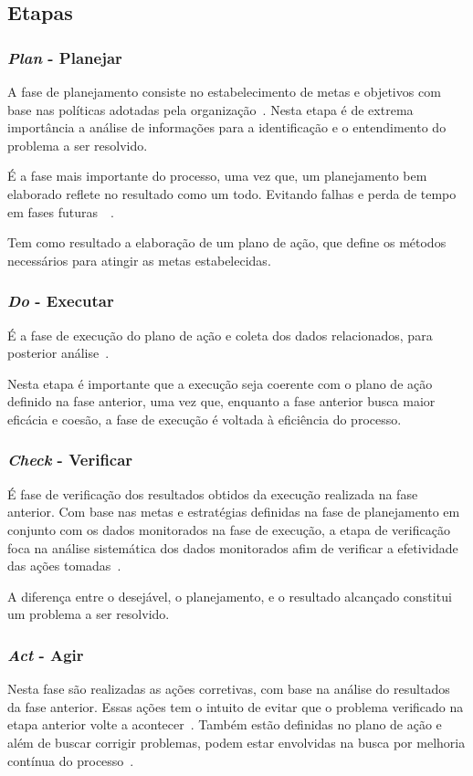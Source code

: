 \subsection{Etapas}
\label{pdca:phases}
\subsubsection{\textit{Plan} - Planejar}
A fase de planejamento consiste no estabelecimento de metas e objetivos com base nas políticas adotadas pela organização~\cite{pdcacont}. Nesta etapa é de extrema importância a análise de informações para a identificação e o entendimento do problema a ser resolvido.

É a fase mais importante do processo, uma vez que, um planejamento bem elaborado reflete no resultado como um todo. Evitando falhas e perda de tempo em fases futuras~\cite{fabio2003}~\cite{pdcacont}.

Tem como resultado a elaboração de um plano de ação, que define os métodos necessários para atingir as metas estabelecidas.

\subsubsection{\textit{Do} - Executar}
É a fase de execução do plano de ação e coleta dos dados relacionados, para posterior análise~\cite{pdcacont}.

Nesta etapa é importante que a execução seja coerente com o plano de ação definido na fase anterior, uma vez que, enquanto a fase anterior busca maior eficácia e coesão, a fase de execução é voltada à eficiência do processo.

\subsubsection{\textit{Check} - Verificar}
É fase de verificação dos resultados obtidos da execução realizada na fase anterior. Com base nas metas e estratégias definidas na fase de planejamento em conjunto com os dados monitorados na fase de execução, a etapa de verificação foca na análise sistemática dos dados monitorados afim de verificar a efetividade das ações tomadas~\cite{pdcacont}.

A diferença entre o desejável, o planejamento, e o resultado alcançado constitui um problema a ser resolvido.

\subsubsection{\textit{Act} - Agir}
Nesta fase são realizadas as ações corretivas, com base na análise do resultados da fase anterior. Essas ações tem o intuito de evitar que o problema verificado na etapa anterior volte a acontecer~\cite{pdcacont}. Também estão definidas no plano de ação e além de buscar corrigir problemas, podem estar envolvidas na busca por melhoria contínua do processo~\cite{pdcaknow}.

